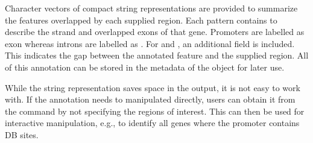 \documentclass{report}\usepackage[]{graphicx}\usepackage[usenames,dvipsnames]{color}
\newcommand{\hlopt}[1]{\textcolor[rgb]{0,0,0}{#1}}%
\newcommand{\hlstd}[1]{\textcolor[rgb]{0.251,0.251,0.251}{#1}}%
\newcommand{\hlkwb}[1]{\textcolor[rgb]{0,0,0}{#1}}%
\newenvironment{knitrout}{}{} %
\begin{document}
Character vectors of compact string representations are provided to summarize the features overlapped by each supplied region. 
Each pattern contains  to describe the strand and overlapped exons of that gene. 
Promoters are labelled as exon  whereas introns are labelled as . 
For  and , an additional \Rcode{[DISTANCE]} field is included.
This indicates the gap between the annotated feature and the supplied region.
All of this annotation can be stored in the metadata of the  object for later use.

\begin{knitrout}
\color{fgcolor}
\end{knitrout}

While the string representation saves space in the output, it is not easy to work with.
If the annotation needs to manipulated directly, users can obtain it from the  command by not specifying the regions of interest. 
This can then be used for interactive manipulation, e.g., to identify all genes where the promoter contains DB sites.
\end{document}
